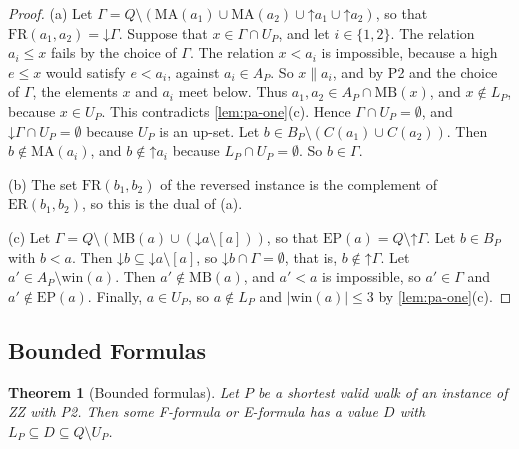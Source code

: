 \documentclass[pdflatex,sn-mathphys-num]{sn-jnl}%
\theoremstyle{thmstyleone}%
\newtheorem{theorem}{Theorem}%
\theoremstyle{thmstyletwo}%
\theoremstyle{thmstylethree}%
\newcommand{\dn}{\mathord{\downarrow}}%
\newcommand{\upp}{\mathord{\uparrow}}%
\newcommand{\MB}{\mathrm{MB}}%
\newcommand{\MA}{\mathrm{MA}}%
\newcommand{\win}{\mathrm{win}}%
\newcommand{\FR}{\mathrm{FR}}%
\newcommand{\ER}{\mathrm{ER}}%
\newcommand{\EP}{\mathrm{EP}}%
\begin{document}
\begin{proof}
(a) Let $\Gamma = Q \setminus (\MA(a_1) \cup \MA(a_2) \cup \upp a_1 \cup \upp a_2)$, so that $\FR(a_1, a_2) = \dn \Gamma$.
Suppose that $x \in \Gamma \cap U_P$, and let $i \in \{1, 2\}$.
The relation $a_i \leq x$ fails by the choice of $\Gamma$.
The relation $x < a_i$ is impossible, because a high $e \leq x$ would satisfy $e < a_i$, against $a_i \in A_P$.
So $x \parallel a_i$, and by P2 and the choice of $\Gamma$, the elements $x$ and $a_i$ meet below.
Thus $a_1, a_2 \in A_P \cap \MB(x)$, and $x \notin L_P$, because $x \in U_P$.
This contradicts \cref{lem:pa-one}(c).
Hence $\Gamma \cap U_P = \emptyset$, and $\dn \Gamma \cap U_P = \emptyset$ because $U_P$ is an up-set.
Let $b \in B_P \setminus (C(a_1) \cup C(a_2))$.
Then $b \notin \MA(a_i)$, and $b \notin \upp a_i$ because $L_P \cap U_P = \emptyset$.
So $b \in \Gamma$.

(b) The set $\FR(b_1, b_2)$ of the reversed instance is the complement of $\ER(b_1, b_2)$, so this is the dual of (a).

(c) Let $\Gamma = Q \setminus (\MB(a) \cup (\dn a \setminus [a]))$, so that $\EP(a) = Q \setminus \upp \Gamma$.
Let $b \in B_P$ with $b < a$.
Then $\dn b \subseteq \dn a \setminus [a]$, so $\dn b \cap \Gamma = \emptyset$, that is, $b \notin \upp \Gamma$.
Let $a' \in A_P \setminus \win(a)$.
Then $a' \notin \MB(a)$, and $a' < a$ is impossible, so $a' \in \Gamma$ and $a' \notin \EP(a)$.
Finally, $a \in U_P$, so $a \notin L_P$ and $|\win(a)| \leq 3$ by \cref{lem:pa-one}(c).
\end{proof}

\subsection{Bounded Formulas}
\label{sec:pa-formulas}

\begin{theorem}[Bounded formulas]
\label{thm:pa-formulas}
Let $P$ be a shortest valid walk of an instance of ZZ with P2.
Then some F-formula or E-formula has a value $D$ with $L_P \subseteq D \subseteq Q \setminus U_P$.
\end{theorem}
\end{document}
